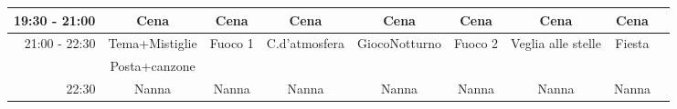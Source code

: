 \documentclass[a4paper]{article}
\begin{document}
\begin{landscape}
\begin{adjustwidth}{-2.5cm}{-1cm}
\begin{tabular}{|r|c|c|c|c|c|c|c|c|}
        19:30 - 21:00&Cena&Cena&Cena&Cena&Cena&Cena&Cena&\\ \hline      
        \multirow{2}{*}{21:00 - 22:30}&Tema+Mistiglie&Fuoco 1&C.d'atmosfera&GiocoNotturno&Fuoco 2&Veglia alle stelle&Fiesta&\\&Posta+canzone& & & & & & & \\\hline        

        22:30&Nanna&Nanna&Nanna&Nanna&Nanna&Nanna&Nanna&\\ \hline
        \end{tabular}  
        \end{adjustwidth}
\end{landscape}

\newpage
    
\newpage
    
\newpage
    
\newpage
    
\newpage
    
\newpage
    
\newpage
    
\newpage
    
\end{document}
